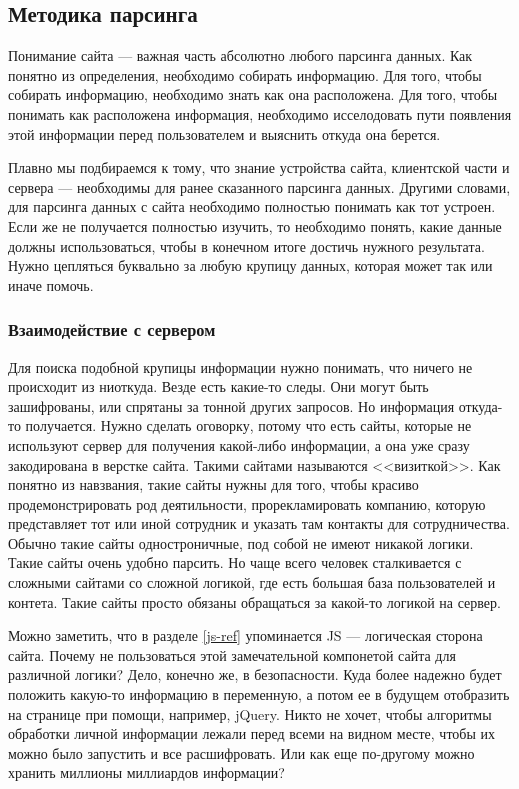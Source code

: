 \subsection{Методика парсинга}
Понимание сайта --- важная часть абсолютно любого парсинга данных. Как понятно из определения, необходимо собирать информацию.
Для того, чтобы собирать информацию, необходимо знать как она расположена.
Для того, чтобы понимать как расположена информация, необходимо исселодовать пути появления этой информации перед пользователем и 
выяснить откуда она берется.

Плавно мы подбираемся к тому, что знание устройства сайта, клиентской части и сервера --- необходимы для ранее сказанного парсинга данных.
Другими словами, для парсинга данных с сайта необходимо полностью понимать как тот устроен. 
Если же не получается полностью изучить, то необходимо понять, какие данные должны использоваться, чтобы в конечном итоге достичь нужного результата.
Нужно цепляться буквально за любую крупицу данных, которая может так или иначе помочь.

\subsubsection{Взаимодействие с сервером}
Для поиска подобной крупицы информации нужно понимать, что ничего не происходит из ниоткуда. Везде есть какие-то следы.
Они могут быть зашифрованы, или спрятаны за тонной других запросов. Но информация откуда-то получается.
Нужно сделать оговорку, потому что есть сайты, которые не используют сервер для получения какой-либо информации, 
а она уже сразу закодирована в верстке сайта. Такими сайтами называются <<визиткой>>.
Как понятно из навзвания, такие сайты нужны для того, чтобы красиво продемонстрировать род деятильности, прорекламировать компанию,
которую представляет тот или иной сотрудник и указать там контакты для сотрудничества.
Обычно такие сайты одностроничные, под собой не имеют никакой логики. Такие сайты очень удобно парсить.
Но чаще всего человек сталкивается с сложными сайтами со сложной логикой, где есть большая база пользователей и контета.
Такие сайты просто обязаны обращаться за какой-то логикой на сервер.

Можно заметить, что в разделе \ref{js-ref} упоминается JS --- логическая сторона сайта. Почему не пользоваться этой замечательной компонетой сайта для различной логики?
Дело, конечно же, в безопасности. Куда более надежно будет положить какую-то информацию в переменную, а потом ее в будущем отобразить на странице при помощи, например, jQuery.
Никто не хочет, чтобы алгоритмы обработки личной информации лежали перед всеми на видном месте, чтобы их можно было запустить и все расшифровать.
Или как еще по-другому можно хранить миллионы миллиардов информации?


